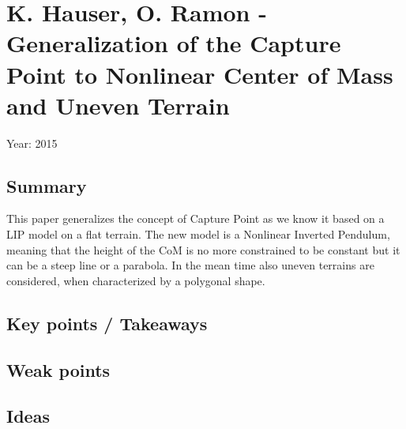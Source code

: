 \section{K. Hauser, O. Ramon - Generalization of the Capture Point to Nonlinear Center of Mass and Uneven Terrain \cite{RamonHauser2015}}
Year: 2015
\subsection*{Summary}
This paper generalizes the concept of Capture Point as we know it based on a LIP model on a flat terrain. The new model is a Nonlinear Inverted Pendulum, meaning that the height of the CoM is no more constrained to be constant but it can be a steep line or a parabola. In the mean time also uneven terrains are considered, when characterized by a polygonal shape.
\subsection*{Key points / Takeaways}
\subsection*{Weak points}
\subsection*{Ideas}
